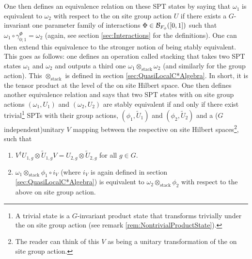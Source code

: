 \documentclass[12pt,a4paper,twoside]{article}
\numberwithin{equation}{section}
\begin{document}
\\\\
One then defines an equivalence relation on these SPT states by saying that $\omega_1$ is equivalent to $\omega_2$ with respect to the on site group action $U$ if there exists a $G$-invariant one parameter family of interactions $\Phi\in\mathcal B_{F_\phi}([0,1])$ such that $\omega_1\circ\gamma^\Phi_{0;1}=\omega_2$ (again, see section \ref{sec:Interactions} for the definitions). One can then extend this equivalence to the stronger notion of being stably equivalent. This goes as follows: one defines an operation called stacking that takes two SPT states $\omega_1$ and $\omega_2$ and outputs a third one $\omega_1\otimes_{\text{stack}}\omega_2$ (and similarly for the group action). This $\otimes_\text{stack}$ is defined in section \ref{sec:QuasiLocalC*Algebra}. In short, it is the tensor product at the level of the on site Hilbert space. One then defines another equivalence relation and says that two SPT states with on site group actions $(\omega_1,U_1)$ and $(\omega_2,U_2)$ are stably equivalent if and only if there exist trivial\footnote{A trivial state is a $G$-invariant product state that transforms trivially under the on site group action (see remark \ref{rem:NontrivialProductState}).} SPTs with their group actions, $(\phi_1,\tilde{U}_1)$ and $(\phi_2,\tilde{U}_2)$ and a ($G$ independent)unitary $V$ mapping between the respective on site Hilbert spaces\footnote{The reader can think of this $V$ as being a unitary transformation of the on site group action.}, such that
\begin{enumerate}
	\item $V^\dagger U_{1,g}\otimes \tilde{U}_{1,g}V=U_{2,g}\otimes \tilde{U}_{2,g}$ for all $g\in G$.
	\item $\omega_1\otimes_{\text{stack}}\phi_1\circ i_V$ (where $i_V$ is again defined in section \ref{sec:QuasiLocalC*Algebra}) is equivalent to $\omega_2\otimes_{\text{stack}}\phi_2$ with respect to the above on site group action.
\end{enumerate}
\end{document}
